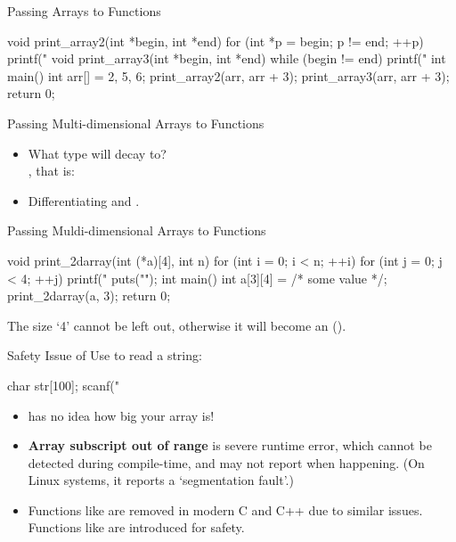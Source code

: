 \documentclass{beamer}
\begin{document}
\begin{frame}[fragile]{Passing Arrays to Functions}
	\begin{cpp}
void print_array2(int *begin, int *end) {
  for (int *p = begin; p != end; ++p)
    printf("%
}
void print_array3(int *begin, int *end) {
  while (begin != end)
    printf("%
}
int main() {
  int arr[] = {2, 5, 6};
  print_array2(arr, arr + 3);
  print_array3(arr, arr + 3);
  return 0;
}
	\end{cpp}
\end{frame}

\begin{frame}[fragile]{Passing Multi-dimensional Arrays to Functions}
	\begin{itemize}
		\item What type will  decay to?\\
		\pause
		, that is:\\
		\pause
		\item Differentiating  and .\\
	\end{itemize}
\end{frame}

\begin{frame}[fragile]{Passing Muldi-dimensional Arrays to Functions}
	\begin{cpp}
void print_2darray(int (*a)[4], int n) {
  for (int i = 0; i < n; ++i) {
    for (int j = 0; j < 4; ++j)
      printf("%
    puts("");
  }
}
int main() {
  int a[3][4] = /* some value */;
  print_2darray(a, 3);
  return 0;
}
	\end{cpp}
	The size `4' cannot be left out, otherwise it will become an  ().
\end{frame}

\begin{frame}[fragile]{Safety Issue of }
	Use  to read a string:
	\begin{cpp}
char str[100];
scanf("%
	\end{cpp}
	\pause
	\begin{itemize}
		\item {} has no idea how big your array is!
		\item \textbf{Array subscript out of range} is severe runtime error, which cannot be detected during compile-time, and may not report when happening. (On Linux systems, it reports a `segmentation fault'.)
		\pause
		\item Functions like  are removed in modern C and C++ due to similar issues. Functions like  are introduced for safety.
	\end{itemize}
\end{frame}
\end{document}
